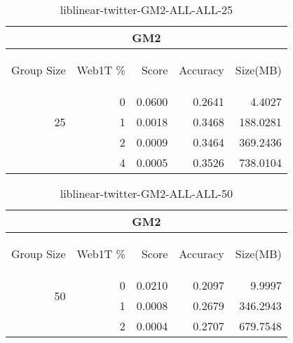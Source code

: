 \begin{center}
\begin{table}[htbp] 
 \begin{center}
\begin{tabular}{ | r | r | r | r | r |}
\hline
\multicolumn{5}{|c|}{GM2}\\
\hline
\begin{sideways}Group Size\end{sideways} & \begin{sideways}Web1T \%\end{sideways} & \begin{sideways}Score\end{sideways} & \begin{sideways}Accuracy\end{sideways} & \begin{sideways}Size(MB)\end{sideways}\\
\hline
\multirow{3}{*}{25}
 & 0 & 0.0600 & 0.2641 & 4.4027\\ \cline{2-5}
 & 1 & 0.0018 & 0.3468 & 188.0281\\ \cline{2-5}
 & 2 & 0.0009 & 0.3464 & 369.2436\\ \cline{2-5}
 & 4 & 0.0005 & 0.3526 & 738.0104\\ \cline{2-5}
\hline
\end{tabular}
\caption{liblinear-twitter-GM2-ALL-ALL-25}
\label{table:liblinear-twitter-GM2-ALL-ALL-25}
\end{center}
 \end{table}
\end{center}

\begin{center}
\begin{table}[htbp] 
 \begin{center}
\begin{tabular}{ | r | r | r | r | r |}
\hline
\multicolumn{5}{|c|}{GM2}\\
\hline
\begin{sideways}Group Size\end{sideways} & \begin{sideways}Web1T \%\end{sideways} & \begin{sideways}Score\end{sideways} & \begin{sideways}Accuracy\end{sideways} & \begin{sideways}Size(MB)\end{sideways}\\
\hline
\multirow{2}{*}{50}
 & 0 & 0.0210 & 0.2097 & 9.9997\\ \cline{2-5}
 & 1 & 0.0008 & 0.2679 & 346.2943\\ \cline{2-5}
 & 2 & 0.0004 & 0.2707 & 679.7548\\ \cline{2-5}
\hline
\end{tabular}
\caption{liblinear-twitter-GM2-ALL-ALL-50}
\label{table:liblinear-twitter-GM2-ALL-ALL-50}
\end{center}
 \end{table}
\end{center}

